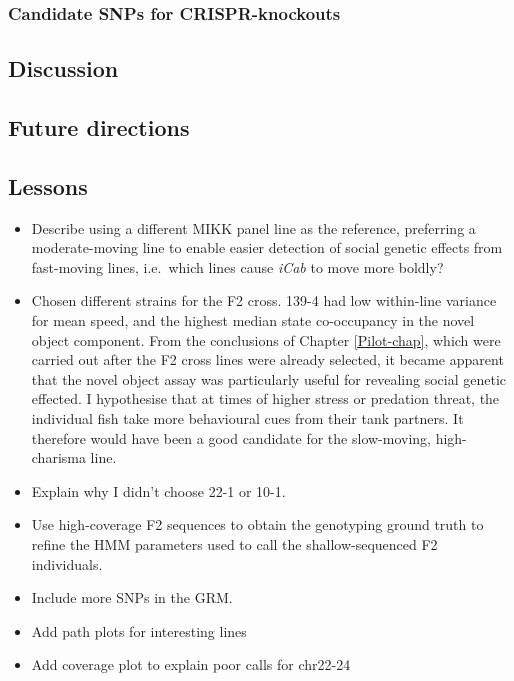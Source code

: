 \documentclass[
]{article}
\begin{document}
\hypertarget{candidate-snps-for-crispr-knockouts}{%
\subsubsection{Candidate SNPs for CRISPR-knockouts}\label{candidate-snps-for-crispr-knockouts}}

\hypertarget{discussion}{%
\subsection{Discussion}\label{discussion}}

\hypertarget{future-directions}{%
\subsection{Future directions}\label{future-directions}}

\hypertarget{lessons}{%
\subsection{Lessons}\label{lessons}}

\begin{itemize}
\item
  Describe using a different MIKK panel line as the reference, preferring a moderate-moving line to enable easier detection of social genetic effects from fast-moving lines, i.e.~which lines cause \emph{\textcolor{iCab_424B4D}{iCab}} to move more boldly?
\item
  Chosen different strains for the F2 cross. 139-4 had low within-line variance for mean speed, and the highest median state co-occupancy in the novel object component. From the conclusions of Chapter \ref{Pilot-chap}, which were carried out after the F2 cross lines were already selected, it became apparent that the novel object assay was particularly useful for revealing social genetic effected. I hypothesise that at times of higher stress or predation threat, the individual fish take more behavioural cues from their tank partners. It therefore would have been a good candidate for the slow-moving, high-charisma line.
\item
  Explain why I didn't choose 22-1 or 10-1.
\item
  Use high-coverage F2 sequences to obtain the genotyping ground truth to refine the HMM parameters used to call the shallow-sequenced F2 individuals.
\item
  Include more SNPs in the GRM.
\item
  Add path plots for interesting lines
\item
  Add coverage plot to explain poor calls for chr22-24
\end{itemize}
\end{document}
